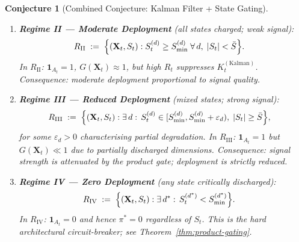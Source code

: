 \documentclass[12pt,openany]{book}
\numberwithin{equation}{chapter}
\theoremstyle{plain}
\newtheorem{conjecture}[theorem]{Conjecture}
\theoremstyle{definition}
\theoremstyle{remark}
\def\mathcal#1{#1}%
\begin{document}
\begin{conjecture}[Combined Conjecture: Kalman Filter + State Gating]
\begin{enumerate}
  \item \textbf{Regime II — Moderate Deployment}
        (all states charged; weak signal):
        \begin{align}
          \mathcal{R}_{\mathrm{II}}
          &\;:=\;
          \Bigl\{(\mathbf{X}_t, S_t) :
            \mathcal{S}_t^{(d)} \geq \mathcal{S}_{\min}^{(d)}
            \;\forall\, d,\;
            |S_t| < \bar{S}
          \Bigr\}.
          \label{eq:regime-II}
        \end{align}
        In $\mathcal{R}_{\mathrm{II}}$:
        $\mathbf{1}_{\mathcal{A}_t} = 1$,
        $G(\mathbf{X}_t) \approx 1$, but high $R_t$
        suppresses $K_t^{(\mathrm{Kalman})}$.
        Consequence: moderate deployment proportional
        to signal quality.

  \item \textbf{Regime III — Reduced Deployment}
        (mixed states; strong signal):
        \begin{align}
          \mathcal{R}_{\mathrm{III}}
          &\;:=\;
          \Bigl\{(\mathbf{X}_t, S_t) :
            \exists\, d :\,
            \mathcal{S}_t^{(d)} \in
            [\mathcal{S}_{\min}^{(d)}, \mathcal{S}_{\min}^{(d)}
             + \varepsilon_d),\;
            |S_t| \geq \bar{S}
          \Bigr\},
          \label{eq:regime-III}
        \end{align}
        for some $\varepsilon_d > 0$ characterising partial
        degradation.  In $\mathcal{R}_{\mathrm{III}}$:
        $\mathbf{1}_{\mathcal{A}_t} = 1$ but
        $G(\mathbf{X}_t) \ll 1$ due to partially discharged
        dimensions.
        Consequence: signal strength is attenuated by the
        product gate; deployment is strictly reduced.

  \item \textbf{Regime IV — Zero Deployment}
        (any state critically discharged):
        \begin{align}
          \mathcal{R}_{\mathrm{IV}}
          &\;:=\;
          \Bigl\{(\mathbf{X}_t, S_t) :
            \exists\, d^* :\,
            \mathcal{S}_t^{(d^*)} < \mathcal{S}_{\min}^{(d^*)}
          \Bigr\}.
          \label{eq:regime-IV}
        \end{align}
        In $\mathcal{R}_{\mathrm{IV}}$:
        $\mathbf{1}_{\mathcal{A}_t} = 0$
        and hence $\pi^* = 0$ regardless of $S_t$.
        This is the hard architectural circuit-breaker;
        see Theorem~\ref{thm:product-gating}.
\end{enumerate}


\end{conjecture}
\end{document}

